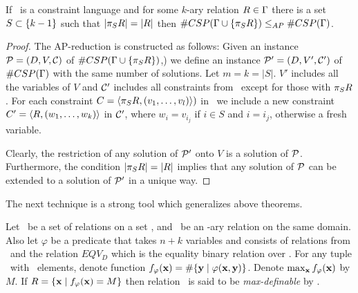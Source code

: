 \begin{lemma}\label{lem:projection}
If \mrelset\ is a constraint language and for some \(k\)-ary relation \(R\in\Gamma\)
there is a set \(S\subset \{{k-1}\}\) such that \(|\pi_{S}{R}|=|R|\) then 
\(\#CSP(\Gamma \cup \{{\pi_{S}{R}}\}) \le_{AP} \#CSP(\Gamma)\).
\end{lemma}

\begin{proof}
The AP-reduction is constructed as follows: Given an instance \(\mathcal{P}=(D,V,\mathcal{C})\)
of \(\#CSP(\Gamma\cup \{\pi_{S}{R}\})\),) we define an 
instance \(\mathcal{P}'=(D,V',\mathcal{C}')\) of \(\#CSP(\Gamma)\) with the same number of solutions.
Let \(m=k=|S|\)\@. \(V'\) includes all the variables of \(V\) and
\(\mathcal{C}'\) includes all constraints from \mconset\ except for those with \(\pi_{S}{R}\). For each
constraint \(C=\langle \pi_{S}{R},(v_1,\dotsc,v_l) \rangle)\) in \mconset\ 
we include a new constraint \(C'=\langle R,(w_1,\dotsc,w_k) \rangle\) in \(\mathcal{C}'\), where 
\(w_i=v_{i_j}\) if \(i\in S\) and \(i=i_j\), otherwise a fresh variable.

Clearly, the restriction of any solution of \(\mathcal{P}'\) onto \(V\) is a solution of \(\mathcal{P}\)\@.
Furthermore, the condition \(|\pi_{S}{R}|=|R|\) implies that any solution of \(\mathcal{P}\)
can be extended to a solution of \(\mathcal{P}'\) in a unique way.
\end{proof}



The next technique is a strong tool which generalizes above theorems. 

\begin{defi}[Max-definable]\label{def:max}
Let \mrelset\ be a set of relations on a set \mD, and \mR\ be an \mn-ary relation on the same 
domain. Also let \(\varphi\) be a predicate that takes \(n+k\) variables and
consists of relations from \mrelset\ and the relation
\(EQV_D\) which is the equality binary relation over \mD\@.
For any tuple \mn\ with \mn\ elements, denote function
\(f_\varphi(\textbf{x})=\#\{{\textbf{y}\mid \varphi(\textbf{x},\textbf{y})}\}\)\@.
Denote \(\max_{\textbf{x}} f_\varphi(\textbf{x})\) by \(M\)\@.
If  \(R=\{{\textbf{x} \mid f_\varphi(\textbf{x}) = M}\}\) then
relation \mR\ is said to be \emph{max-definable} by \mrelset\@.
\end{defi} 

